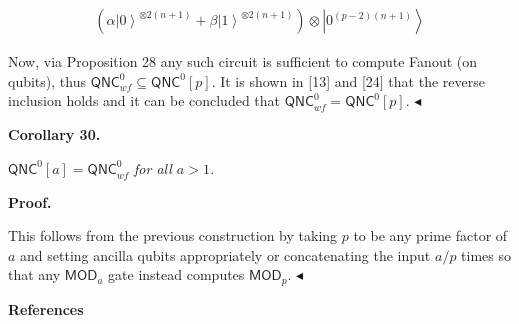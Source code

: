\[\begin{gathered}
\displaystyle(\alpha\left|0\right\rangle^{\otimes 2(n+1)}+\beta\left|1\right\rangle^{\otimes 2(n+1)})\otimes\left|0^{(p-2)(n+1)}\right\rangle
\end{gathered}\]


Now, via Proposition 28 any such circuit is sufficient to compute Fanout (on qubits), thus ${\mathsf{QNC}}^{0}_{wf}\subseteq{\mathsf{QNC}}^{0}[p]$. It is shown in [13] and [24] that the reverse inclusion holds and it can be concluded that ${\mathsf{QNC}}^{0}_{wf}={\mathsf{QNC}}^{0}[p]$.
$\blacktriangleleft$\par





\par\medskip\noindent\textbf{
\textbf{Corollary 30}\textbf{.}
}\par



${\mathsf{QNC}}^{0}[a]={\mathsf{QNC}}^{0}_{wf}$\emph{ for all $a>1$.}\par







\par\medskip\noindent\textbf{Proof.}\par




This follows from the previous construction by taking $p$ to be any prime factor of $a$ and setting ancilla qubits appropriately or concatenating the input $a/p$ times so that any $\mathsf{MOD}_{a}$ gate instead computes $\mathsf{MOD}_{p}$.
$\blacktriangleleft$\par







\par\medskip\noindent\textbf{References}\par



